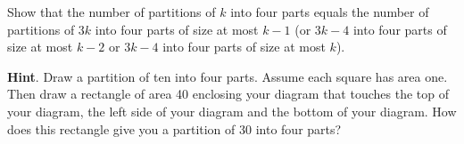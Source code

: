 \documentclass{book}
\begin{document}
\setcounter{cpjt}{307}
\addtocounter{cpjt}{-1}
\begin{activity}\label{rectanglecomplement}
\hypertarget{p-1513}{}%
Show that the number of partitions of \(k\) into four parts equals the number of partitions of \(3k\) into four parts of size at most \(k-1\) (or \(3k-4\) into four parts of size at most \(k-2\) or \(3k-4\) into four parts of size at most \(k\)).%
\par\smallskip%
\noindent\textbf{Hint}.\hypertarget{hint-193}{}\quad%
\hypertarget{p-1514}{}%
Draw a partition of ten into four parts. Assume each square has area one. Then draw a rectangle of area 40 enclosing your diagram that touches the top of your diagram, the left side of your diagram and the bottom of your diagram. How does this rectangle give you a partition of 30 into four parts?%
\par\smallskip%
\noindent\end{activity}

\clearpage
\end{document}
